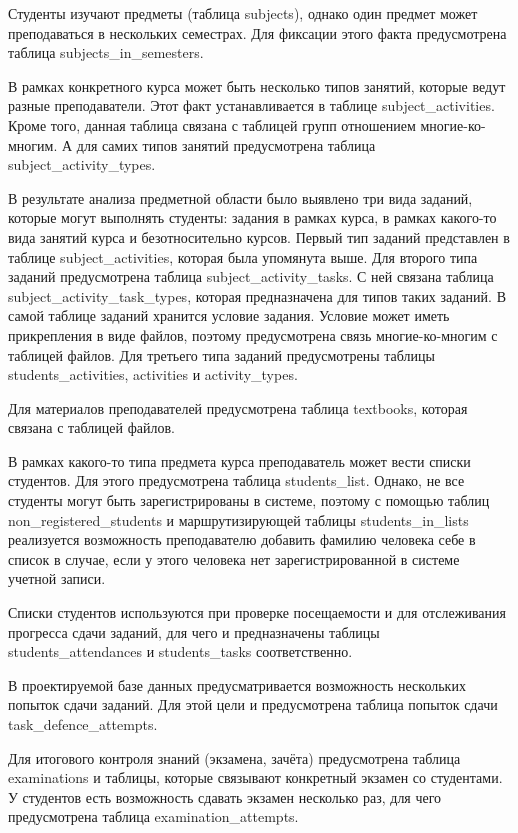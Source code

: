 Студенты изучают предметы (таблица subjects), однако один предмет может преподаваться в нескольких семестрах. Для фиксации этого факта предусмотрена таблица subjects\_in\_semesters. 

В рамках конкретного курса может быть несколько типов занятий, которые ведут разные преподаватели. Этот факт устанавливается в таблице subject\_activities. Кроме того, данная таблица связана с таблицей групп отношением многие-ко-многим. А для самих типов занятий предусмотрена таблица subject\_activity\_types.

В результате анализа предметной области было выявлено три вида заданий, которые могут выполнять студенты: задания в рамках курса, в рамках какого-то вида занятий курса и безотносительно курсов. Первый тип заданий представлен в таблице subject\_activities, которая была упомянута выше. Для второго типа заданий предусмотрена таблица subject\_activity\_tasks. С ней связана таблица subject\_activity\_task\_types, которая предназначена для типов таких заданий. В самой таблице заданий хранится условие задания. Условие может иметь прикрепления в виде файлов, поэтому предусмотрена связь многие-ко-многим с таблицей файлов. Для третьего типа заданий предусмотрены таблицы students\_activities, activities и activity\_types.

Для материалов преподавателей предусмотрена таблица textbooks, которая связана с таблицей файлов.

В рамках какого-то типа предмета курса преподаватель может вести списки студентов. Для этого предусмотрена таблица students\_list. Однако, не все студенты могут быть зарегистрированы в системе, поэтому с помощью таблиц non\_registered\_students и маршрутизирующей таблицы students\_in\_lists реализуется возможность преподавателю добавить фамилию человека себе в список в случае, если у этого человека нет зарегистрированной в системе учетной записи.

Списки студентов используются при проверке посещаемости и для отслеживания прогресса сдачи заданий, для чего и предназначены таблицы students\_attendances и students\_tasks соответственно.

В проектируемой базе данных предусматривается возможность нескольких попыток сдачи заданий. Для этой цели и предусмотрена таблица попыток сдачи task\_defence\_attempts.

Для итогового контроля знаний (экзамена, зачёта) предусмотрена таблица examinations и таблицы, которые связывают конкретный экзамен со студентами. У студентов есть возможность сдавать экзамен несколько раз, для чего предусмотрена таблица examination\_attempts.

